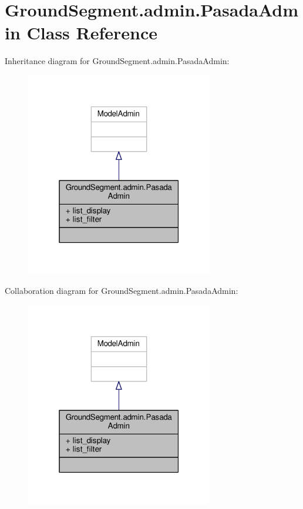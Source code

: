 \hypertarget{class_ground_segment_1_1admin_1_1_pasada_admin}{}\section{Ground\+Segment.\+admin.\+Pasada\+Admin Class Reference}
\label{class_ground_segment_1_1admin_1_1_pasada_admin}


Inheritance diagram for Ground\+Segment.\+admin.\+Pasada\+Admin\+:\nopagebreak
\begin{figure}[H]
\begin{center}
\leavevmode
\includegraphics[width=232pt]{class_ground_segment_1_1admin_1_1_pasada_admin__inherit__graph}
\end{center}
\end{figure}


Collaboration diagram for Ground\+Segment.\+admin.\+Pasada\+Admin\+:\nopagebreak
\begin{figure}[H]
\begin{center}
\leavevmode
\includegraphics[width=232pt]{class_ground_segment_1_1admin_1_1_pasada_admin__coll__graph}
\end{center}
\end{figure}
